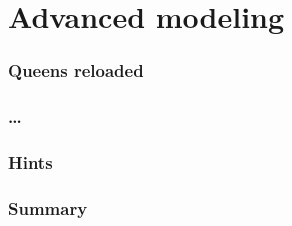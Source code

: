 \part{Advanced modeling}

\section{Queens reloaded}


%
% 
% 
\section{\dots}
\section{Hints}

\section{Summary}

%
